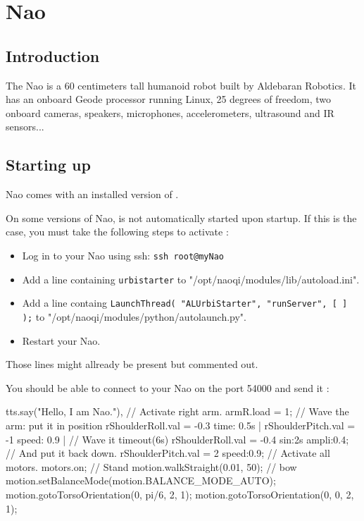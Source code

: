 \newcommand{\naoqi}{NaoQi\xspace}

\chapter{Nao}
\label{sec:nao}
\section{Introduction}

The Nao is a 60 centimeters tall humanoid robot built by Aldebaran Robotics.
It has an onboard Geode processor running Linux, 25 degrees of freedom,
two onboard cameras, speakers, microphones, accelerometers, ultrasound and IR
sensors...

\section{Starting up}

Nao comes with an installed version of \urbi.

On some versions of Nao, \urbi is not automatically started upon startup.
If this is the case, you must take the following steps to activate \urbi:

\begin{itemize}
\item Log in to your Nao using ssh: \lstinline|ssh root@myNao|
\item Add a line containing \lstinline|urbistarter| to
"/opt/naoqi/modules/lib/autoload.ini".
\item Add a line containg
\lstinline|LaunchThread( "ALUrbiStarter", "runServer", [ ] );| to "/opt/naoqi/modules/python/autolaunch.py".
\item Restart your Nao.
\end{itemize}

Those lines might allready be present but commented out.

You should be able to connect to your Nao on the port 54000 and send it \us:

\begin{urbifixme}
tts.say("Hello, I am Nao."),
// Activate right arm.
armR.load = 1;
// Wave the arm: put it in position
rShoulderRoll.val = -0.3 time: 0.5s |
rShoulderPitch.val = -1 speed: 0.9 |
// Wave it
timeout(6s) rShoulderRoll.val = -0.4 sin:2s ampli:0.4;
// And put it back down.
rShoulderPitch.val = 2 speed:0.9;
// Activate all motors.
motors.on;
// Stand
motion.walkStraight(0.01, 50);
// bow
motion.setBalanceMode(motion.BALANCE_MODE_AUTO);
motion.gotoTorsoOrientation(0, pi/6, 2, 1);
motion.gotoTorsoOrientation(0, 0, 2, 1);
\end{urbifixme}

